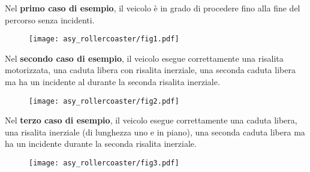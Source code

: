 

\Examples
\begin{example}
%
%
%
\end{example}

\pagebreak
\Explanation
Nel \textbf{primo caso di esempio}, il veicolo \`e in grado di procedere fino alla fine del percorso senza incidenti.
\begin{figure}[H]%
\centering\texttt{[image: asy\_rollercoaster/fig1.pdf]}%
\end{figure}

Nel \textbf{secondo caso di esempio}, il veicolo esegue correttamente una risalita motorizzata, una caduta libera con risalita inerziale, una seconda caduta libera ma ha un incidente al durante la seconda risalita inerziale.
\begin{figure}[H]%
\centering\texttt{[image: asy\_rollercoaster/fig2.pdf]}%
\end{figure}

Nel \textbf{terzo caso di esempio}, il veicolo esegue correttamente una caduta libera, una risalita inerziale (di lunghezza uno e in piano), una seconda caduta libera ma ha un incidente durante la seconda risalita inerziale.
\begin{figure}[H]%
\centering\texttt{[image: asy\_rollercoaster/fig3.pdf]}%
\end{figure}
